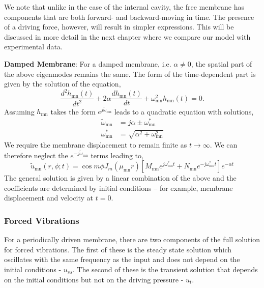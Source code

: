 We note that unlike in the case of the internal cavity, the free membrane has components
that are both forward- and backward-moving in time. The presence of a driving force, however, will result in simpler expressions. This
will be discussed in more detail in the next chapter where we compare our model with experimental data.

\vspace{\baselineskip}
\noindent\textbf{Damped Membrane}: For a damped membrane, i.e. $\alpha\neq 0$, the spatial part of the above eigenmodes remains the same. The form of the
time-dependent part is given by the solution of the equation,
\begin{equation}\label{dampedtimepart}
 \frac{d^2 h_{\mathrm{mn}}(t)}{dt^2}+2\alpha \frac{d h_{\mathrm{mn}}(t)}{dt}+\omega_{\mathrm{mn}}^2h_{\mathrm{mn}}(t)=0.
\end{equation}
Assuming $h_{\mathrm{mn}}$ takes the form $e^{j\widetilde{\omega}_{\mathrm{mn}}}$ leads to a quadratic equation with solutions,
\begin{align}
 \widetilde{\omega}_{\mathrm{mn}}&=j\alpha\pm\omega_{\mathrm{mn}}^*\\
 \omega_{\mathrm{mn}}^*&=\sqrt{\alpha^2+\omega^2_{\mathrm{mn}}}
\end{align}
We require the membrane displacement to remain finite as $t\rightarrow\infty$. We can therefore neglect the $e^{-j\widetilde{\omega}_{\mathrm{mn}}}$ terms leading
to,
\begin{equation}\label{circularmembranedampedeigen}
 \widetilde{u}_{\mathrm{mn}}(r,\phi;t)=\cos m\phi J_m(\mu_{\mathrm{mn}} r)\left[M_{\mathrm{mn}}e^{j\omega_{\mathrm{mn}}^* t}+N_{\mathrm{mn}}e^{-j\omega_{\mathrm{mn}}^* t}\right]e^{-\alpha t}
\end{equation}
The general solution is given by a linear combination of the above and the coefficients are determined by initial conditions -- for example,
membrane displacement and velocity at $t=0$.
\subsubsection*{Forced Vibrations}
For a periodically driven membrane, there are two components of the full solution for forced vibrations. The first of these is the steady state solution which
oscillates with the same frequency as the input and does not depend on the initial conditions - $u_{ss}$. The second of these is the transient solution that depends
on the initial conditions but not on the driving pressure - $u_t$. 

